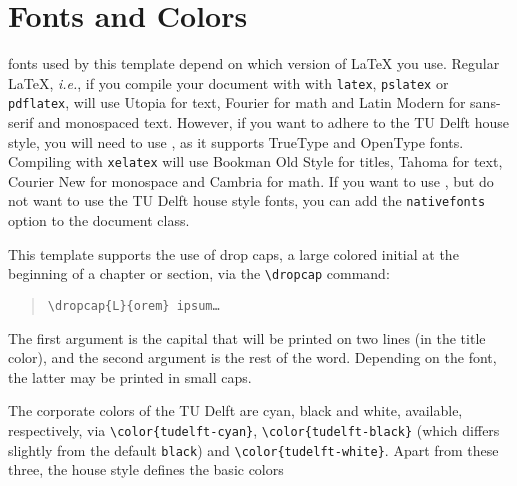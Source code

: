 \section{Fonts and Colors}

 fonts used by this template depend on which version of \LaTeX{} you use.
Regular \LaTeX, \emph{i.e.}, if you compile your document with with \texttt{latex}, \texttt{pslatex} or \texttt{pdflatex}, will use Utopia for text, Fourier for math and Latin Modern for sans-serif and monospaced text.
However, if you want to adhere to the TU Delft house style, you will need to use \XeLaTeX, as it supports TrueType and OpenType fonts.
Compiling with \texttt{xelatex} will use Bookman Old Style for titles, Tahoma for text, Courier New for monospace and Cambria for math.
If you want to use \XeLaTeX, but do not want to use the TU Delft house style fonts, you can add the \texttt{nativefonts} option to the document class.

This template supports the use of drop caps, a large colored initial at the beginning of a chapter or section, via the \texttt{\textbackslash dropcap} command:

\begin{quote}
\texttt{\textbackslash dropcap\{L\}\{orem\} ipsum\ldots}
\end{quote}
The first argument is the capital that will be printed on two lines (in the title color), and the second argument is the rest of the word.
Depending on the font, the latter may be printed in small caps.

The corporate colors of the TU Delft are cyan, black and white, available, respectively, via \texttt{\textbackslash color\{{\color{tudelft-cyan}tudelft-cyan}\}}, \texttt{\textbackslash color\{{\color{tudelft-black}tudelft-black}\}} (which differs slightly from the default \texttt{black}) and \texttt{\textbackslash color\{tudelft-white\}}.
Apart from these three, the house style defines the basic colors

